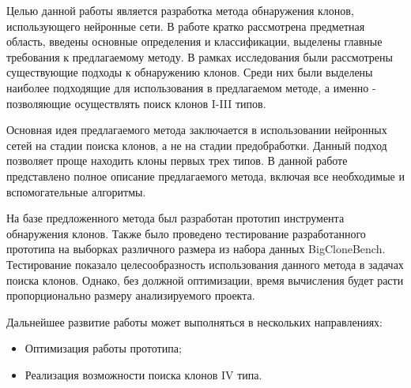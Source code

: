 \conclusion

Целью данной работы является разработка метода обнаружения клонов, использующего нейронные сети. В работе кратко рассмотрена предметная область, введены основные определения и классификации, выделены главные требования к предлагаемому методу. В рамках исследования были рассмотрены существующие подходы к обнаружению клонов. Среди них были выделены наиболее подходящие для использования в предлагаемом методе, а именно - позволяющие осуществлять поиск клонов I-III типов.

Основная идея предлагаемого метода заключается в использовании нейронных сетей на стадии поиска клонов, а не на стадии предобработки. Данный подход позволяет проще находить клоны первых трех типов. В данной работе представлено полное описание предлагаемого метода, включая все необходимые и вспомогательные алгоритмы. 

На базе предложенного метода был разработан прототип инструмента обнаружения клонов. Также было проведено тестирование разработанного прототипа на выборках различного размера из набора данных BigCloneBench. Тестирование показало целесообразность использования данного метода в задачах поиска клонов. Однако, без должной оптимизации, время вычисления будет расти пропорционально размеру анализируемого проекта.

Дальнейшее развитие работы может выполняться в нескольких направлениях:

\begin{itemize}
\setlength\itemsep{0mm}
\item Оптимизация работы прототипа;
\item Реализация возможности поиска клонов IV типа.
\end{itemize}
